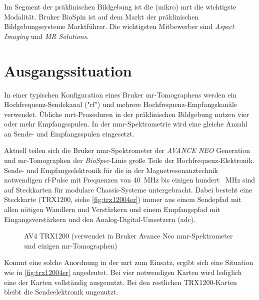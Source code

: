 Im Segment der präklinischen Bildgebung ist die (mikro) \gls{mrt} die wichtigste Modalität. Bruker BioSpin ist auf dem Markt der präklinischen Bildgebungssysteme Marktführer. Die wichtigsten Mitbewerber sind \textit{Aspect Imaging} und \textit{MR Solutions}.
 
\section{Ausgangssituation}
In einer typischen Konfiguration eines Bruker \gls{mr}-Tomographens werden ein Hochfrequenz-Sendekanal ("\gls{rf}") und mehrere Hochfrequenz-Empfangskanäle verwendet. Übliche \gls{mrt}-Prozeduren in der präklinischen Bildgebung nutzen vier oder mehr Empfangsspulen. In der \gls{nmr}-Spektrometrie wird eine gleiche Anzahl an Sende- und Empfangsspulen eingesetzt.

Aktuell teilen sich die Bruker \gls{nmr}-Spektrometer der \textit{AVANCE NEO} Generation und \gls{mr}-Tomographen der \textit{BioSpec}-Linie große Teile der Hochfrequenz-Elektronik. Sende- und Empfangselektronik für die in der Magnetresonanztechnik notwendigen \gls{rf}-Pulse mit Frequenzen von \SI{40}{\mega\hertz} bis einigen hundert \SI{}{\mega\hertz} sind auf Steckkarten für modulare Chassis-Systeme untergebracht. Dabei besteht eine Steckkarte (TRX1200, siehe \autoref{fig:trx12004er}) immer aus einem Sendepfad mit allen nötigen Wandlern und Verstärkern und einem Empfangspfad mit Eingangsverstärkern und den Analog-Digital-Umsetzern (\gls{adc}).

\begin{figure}[H]
	\centering
	\caption[Bruker Avance Neo TRX1200 Karte]{AV4 TRX1200 (verwendet in Bruker Avance Neo \gls{nmr}-Spektrometer und einigen \gls{mr}-Tomographen)}
	\label{fig:trx12004er}
\end{figure}

Kommt eine solche Anordnung in der \gls{mrt} zum Einsatz, ergibt sich eine Situation wie in \autoref{fig:trx12004er} angedeutet. Bei vier notwendigen Karten wird lediglich eine der Karten vollständig ausgenutzt. Bei den restlichen TRX1200-Karten bleibt die Sendeelektronik ungenutzt.


